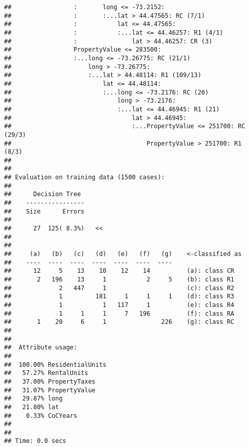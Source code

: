 \documentclass[
]{article}
\newenvironment{Shaded}{\begin{snugshade}}{\end{snugshade}}
\newcommand{\AttributeTok}[1]{\textcolor[rgb]{0.77,0.63,0.00}{#1}}
\newcommand{\CommentTok}[1]{\textcolor[rgb]{0.56,0.35,0.01}{\textit{#1}}}
\newcommand{\ConstantTok}[1]{\textcolor[rgb]{0.00,0.00,0.00}{#1}}
\newcommand{\FunctionTok}[1]{\textcolor[rgb]{0.00,0.00,0.00}{#1}}
\newcommand{\NormalTok}[1]{#1}
\newcommand{\OtherTok}[1]{\textcolor[rgb]{0.56,0.35,0.01}{#1}}
\newcommand{\SpecialCharTok}[1]{\textcolor[rgb]{0.00,0.00,0.00}{#1}}
\newcommand{\StringTok}[1]{\textcolor[rgb]{0.31,0.60,0.02}{#1}}
\begin{document}
\begin{verbatim}
##                 :       long <= -73.2152:
##                 :       :...lat > 44.47565: RC (7/1)
##                 :           lat <= 44.47565:
##                 :           :...lat <= 44.46257: R1 (4/1)
##                 :               lat > 44.46257: CR (3)
##                 PropertyValue <= 283500:
##                 :...long <= -73.26775: RC (21/1)
##                     long > -73.26775:
##                     :...lat > 44.48114: R1 (109/13)
##                         lat <= 44.48114:
##                         :...long <= -73.2176: RC (20)
##                             long > -73.2176:
##                             :...lat <= 44.46945: R1 (21)
##                                 lat > 44.46945:
##                                 :...PropertyValue <= 251700: RC (29/3)
##                                     PropertyValue > 251700: R1 (8/3)
## 
## 
## Evaluation on training data (1500 cases):
## 
##      Decision Tree   
##    ----------------  
##    Size      Errors  
## 
##      27  125( 8.3%)   <<
## 
## 
##     (a)   (b)   (c)   (d)   (e)   (f)   (g)    <-classified as
##    ----  ----  ----  ----  ----  ----  ----
##      12     5    13    10    12    14          (a): class CR
##       2   196    13     1           2     5    (b): class R1
##             2   447     1                      (c): class R2
##             1         181     1     1     1    (d): class R3
##             1           1   117     1          (e): class R4
##             1     1     1     7   196          (f): class RA
##       1    20     6     1               226    (g): class RC
## 
## 
##  Attribute usage:
## 
##  100.00% ResidentialUnits
##   57.27% RentalUnits
##   37.00% PropertyTaxes
##   31.07% PropertyValue
##   29.87% long
##   21.80% lat
##    0.33% CoCYears
## 
## 
## Time: 0.0 secs
\end{verbatim}

\begin{Shaded}
\end{Shaded}
\end{document}
